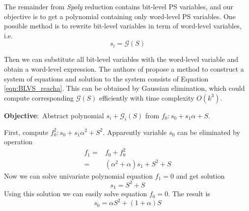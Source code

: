 The remainder from \emph{Spoly} reduction contains bit-level PS variables, and our objective is to get a polynomial 
containing only word-level PS variables. One possible method is 
to rewrite bit-level variables in term of word-level variables, i.e.
\begin{equation}
\label{eqn:BLVS_reacha}
s_i = \mathcal{G}(S)
\end{equation}

Then we can substitute all bit-level variables with the word-level variable
and obtain a word-level expression.
The authors of \cite{pruss:tcad15} propose a method to construct 
a system of equations and solution to the system consists of Equation \ref{eqn:BLVS_reacha}.
This can be obtained by Gaussian elimination, which could 
compute corresponding $\mathcal{G}(S)$ efficiently with time complexity $O(k^3)$.

\begin{Example}
{\bf Objective}:\ Abstract polynomial $s_i + \mathcal{G}_i(S)$ from $f_0: s_0+s_1\alpha+S$.

First, compute $f_0^2: s_0+s_1\alpha^2+S^2$. Apparently variable $s_0$ can be
eliminated by operation 
\begin{align}
f_1 =& f_0 + f_0^2 \nonumber\\
=&(\alpha^2+\alpha)s_1+S^2+S\nonumber
\end{align}
Now we can solve univariate polynomial equation $f_1 = 0$ and get solution
$$s_1 = S^2 + S$$
Using this solution we can easily solve equation $f_0 = 0$. The result is
$$s_0 = \alpha S^2+(1+\alpha)S$$
\end{Example}

